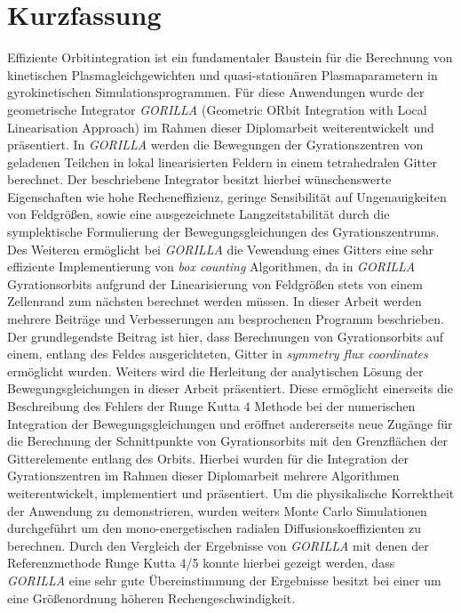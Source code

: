 \documentclass[./main.tex]{subfiles}
\begin{document}
\chapter*{Kurzfassung}
\label{cha:kurzfassung}
Effiziente Orbitintegration ist ein fundamentaler Baustein für die Berechnung von kinetischen Plasmagleichgewichten und quasi-stationären Plasmaparametern in gyrokinetischen Simulationsprogrammen. Für diese Anwendungen wurde der geometrische Integrator \textit{GORILLA}  (Geometric ORbit Integration with Local Linearisation Approach) im Rahmen dieser Diplomarbeit weiterentwickelt und präsentiert. In \textit{GORILLA} werden die Bewegungen der Gyrationszentren von geladenen Teilchen in lokal linearisierten Feldern in einem tetrahedralen Gitter berechnet. Der beschriebene Integrator besitzt hierbei wünschenswerte Eigenschaften wie hohe Recheneffizienz, geringe Sensibilität auf Ungenauigkeiten von Feldgrößen, sowie eine ausgezeichnete Langzeitstabilität durch die symplektische Formulierung der Bewegungsgleichungen des Gyrationszentrums. Des Weiteren ermöglicht bei \textit{GORILLA} die Vewendung eines Gitters eine sehr effiziente Implementierung von \textit{box counting} Algorithmen, da in \textit{GORILLA} Gyrationsorbits aufgrund der Linearisierung von Feldgrößen stets von einem Zellenrand zum nächsten berechnet werden müssen. In dieser Arbeit werden mehrere Beiträge und Verbesserungen am besprochenen Programm beschrieben. 
Der grundlegendste Beitrag ist hier, dass Berechnungen von Gyrationsorbits auf einem, entlang des Feldes ausgerichteten, Gitter in \textit{symmetry flux coordinates} ermöglicht wurden. Weiters wird die Herleitung der analytischen Lösung der Bewegungsgleichungen in dieser Arbeit präsentiert. Diese ermöglicht einerseits die Beschreibung des Fehlers der Runge Kutta 4 Methode bei der numerischen Integration der Bewegungsgleichungen und eröffnet andererseits neue Zugänge für die Berechnung der Schnittpunkte von Gyrationsorbits mit den Grenzflächen der Gitterelemente entlang des Orbits. Hierbei wurden für die Integration der Gyrationszentren im Rahmen dieser Diplomarbeit mehrere Algorithmen weiterentwickelt, implementiert und präsentiert. 
Um die physikalische Korrektheit der Anwendung zu demonstrieren, wurden weiters Monte Carlo Simulationen durchgeführt um den mono-energetischen radialen Diffusionskoeffizienten zu berechnen. Durch den Vergleich der Ergebnisse von \textit{GORILLA} mit denen der Referenzmethode Runge Kutta 4/5 konnte hierbei gezeigt werden, dass \textit{GORILLA} eine sehr gute Übereinstimmung der Ergebnisse besitzt bei einer um eine Größenordnung höheren Rechengeschwindigkeit.
\end{document}
